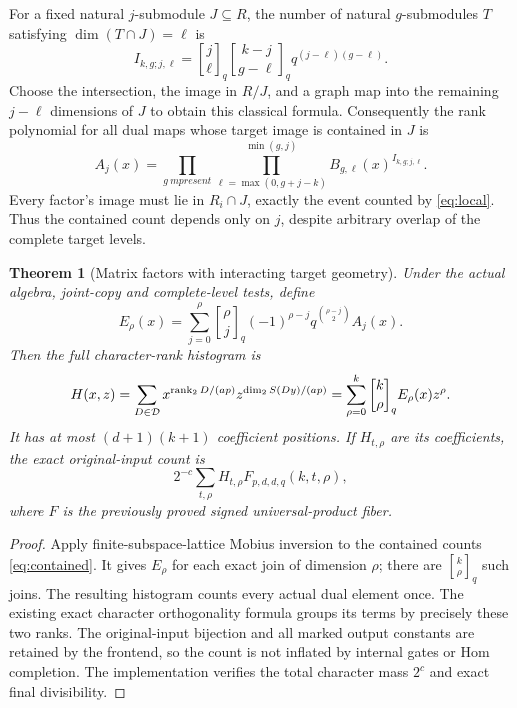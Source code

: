 \documentclass[11pt]{article}
\newtheorem{theorem}{Theorem}\newtheorem{lemma}{Lemma}
\begin{document}
For a fixed natural $j$-submodule $J\subseteq R$, the number of natural
$g$-submodules $T$ satisfying $\dim(T\cap J)=\ell$ is
\begin{equation}\label{eq:intersection}
 I_{k,g;j,\ell}={j\brack\ell}_q{k-j\brack g-\ell}_q
                 q^{(j-\ell)(g-\ell)}.
\end{equation}
Choose the intersection, the image in $R/J$, and a graph map into the
remaining $j-\ell$ dimensions of $J$ to obtain this classical formula.
Consequently the rank polynomial for all dual maps whose target image is
contained in $J$ is
\begin{equation}\label{eq:contained}
 A_j(x)=\prod_{g\ {
m present}}
 \prod_{\ell=\max(0,g+j-k)}^{\min(g,j)}
 B_{g,\ell}(x)^{I_{k,g;j,\ell}}.
\end{equation}
Every factor's image must lie in $R_i\cap J$, exactly the event counted by
\eqref{eq:local}. Thus the contained count depends only on $j$, despite
arbitrary overlap of the complete target levels.

\begin{theorem}[Matrix factors with interacting target geometry]
Under the actual algebra, joint-copy and complete-level tests, define
\[
 E_\rho(x)=\sum_{j=0}^\rho {\rho\brack j}_q
       (-1)^{\rho-j}q^{\binom{\rho-j}{2}}A_j(x).
\]
Then the full character-rank histogram is
\[
 H(x,z)=\sum_{D\in\mathcal D}
 x^{\operatorname{rank}_2D/(ap)}z^{\dim_2S(Dy)/(ap)}
 =\sum_{\rho=0}^k{k\brack\rho}_q E_\rho(x)z^\rho.
\]
It has at most $(d+1)(k+1)$ coefficient positions. If $H_{t,\rho}$ are its
coefficients, the exact original-input count is
\[
 \boxed{2^{-c}\sum_{t,\rho}H_{t,\rho}F_{p,d,d,q}(k,t,\rho),}
\]
where $F$ is the previously proved signed universal-product fiber.
\end{theorem}
\begin{proof}
Apply finite-subspace-lattice Mobius inversion to the contained counts
\eqref{eq:contained}. It gives $E_\rho$ for each exact join of dimension
$\rho$; there are ${k\brack\rho}_q$ such joins. The resulting histogram
counts every actual dual element once. The existing exact character
orthogonality formula groups its terms by precisely these two ranks.
The original-input bijection and all marked output constants are retained
by the frontend, so the count is not inflated by internal gates or Hom
completion. The implementation verifies the total character mass $2^c$
and exact final divisibility.
\end{proof}
\end{document}
